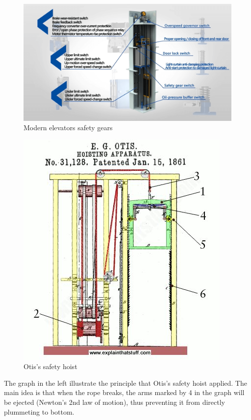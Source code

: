 	\begin{figure}
		\centering
		\includegraphics[width=1\linewidth]{img/safety_gaurantees}
		\caption{Modern elevators safety gears}
		\label{fig:safetygaurantees}
	\end{figure}
 
 	\begin{figure}
 		\begin{center}    		
 			\includegraphics[scale=1.8]{img/Otis_elevator_principle}
 		\end{center}
 		\caption*{Otis's safety hoist}
 	\end{figure}
 	The graph in the left illustrate the principle that Otis's safety hoist 
 	applied. The main idea is that when the rope breaks, the arms marked by 4 
 	in the graph will be ejected (Newton's 2nd law of motion), thus preventing 
 	it from directly plummeting to bottom.
 	
